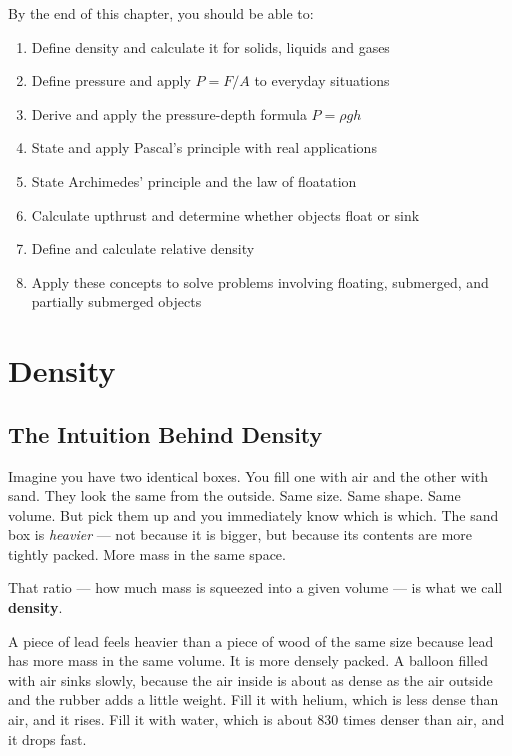\vspace{0.5cm}

\begin{objectivebox}
By the end of this chapter, you should be able to:
\begin{enumerate}[noitemsep]
  \item Define density and calculate it for solids,
  liquids and gases
  \item Define pressure and apply $P = F/A$ to
  everyday situations
  \item Derive and apply the pressure-depth formula
  $P = \rho g h$
  \item State and apply Pascal's principle with
  real applications
  \item State Archimedes' principle and the law of
  floatation
  \item Calculate upthrust and determine whether
  objects float or sink
  \item Define and calculate relative density
  \item Apply these concepts to solve problems
  involving floating, submerged, and partially
  submerged objects
\end{enumerate}
\end{objectivebox}

\section{Density}

\subsection{The Intuition Behind Density}

Imagine you have two identical boxes. You fill one
with air and the other with sand. They look the same
from the outside. Same size. Same shape. Same volume.
But pick them up and you immediately know which is
which. The sand box is \textit{heavier} --- not because
it is bigger, but because its contents are more tightly
packed. More mass in the same space.

That ratio --- how much mass is squeezed into a given
volume --- is what we call \textbf{density}.

A piece of lead feels heavier than a piece of wood of
the same size because lead has more mass in the same
volume. It is more densely packed. A balloon filled with air sinks slowly, because the air inside is
about as dense as the air outside and the rubber adds a little weight.
Fill it with helium, which is less dense than air, and it rises. Fill
it with water, which is about 830 times denser than air, and it drops
fast.

